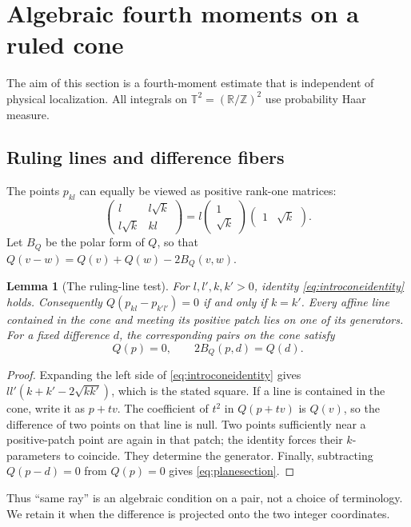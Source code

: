 \documentclass[11pt,reqno]{amsart}
\numberwithin{equation}{section}
\newtheorem{lemma}[lemma]{Lemma}
\theoremstyle{definition}
\theoremstyle{remark}
\newcommand{\R}{\mathbb R}
\newcommand{\T}{\mathbb T}
\newcommand{\Z}{\mathbb Z}
\begin{document}
\FloatBarrier

\section{Algebraic fourth moments on a ruled cone}\label{sec:algebra}\label{sec:energy}
The aim of this section is a fourth-moment estimate that is independent of physical
localization. All integrals on $\T^2=(\R/\Z)^2$ use probability Haar measure.

\subsection{Ruling lines and difference fibers}
The points $p_{kl}$ can equally be viewed as positive rank-one matrices:
\[
 \begin{pmatrix}l&l\sqrt{k}\\l\sqrt{k}&kl\end{pmatrix}
 =l\begin{pmatrix}1\\\sqrt{k}\end{pmatrix}
       \begin{pmatrix}1&\sqrt{k}\end{pmatrix}.
\]
Let $B_Q$ be the polar form of $Q$, so that
$Q(v-w)=Q(v)+Q(w)-2B_Q(v,w)$.

\begin{lemma}[The ruling-line test]\label{lem:ruling}
For $l,l',k,k'>0$, identity \eqref{eq:introconeidentity} holds.
Consequently $Q(p_{kl}-p_{k'l'})=0$ if and only if $k=k'$.
Every affine line contained in the cone and meeting its positive patch lies on one of
its generators. For a fixed difference $d$, the corresponding pairs on the cone satisfy
\begin{equation}\label{eq:planesection}
 Q(p)=0,\qquad 2B_Q(p,d)=Q(d).
\end{equation}
\end{lemma}
\begin{proof}
Expanding the left side of \eqref{eq:introconeidentity} gives
$ll'(k+k'-2\sqrt{kk'})$, which is the stated square.
If a line is contained in the cone, write it as $p+tv$.
The coefficient of $t^2$ in $Q(p+tv)$ is $Q(v)$, so the difference of two points on that
line is null. Two points sufficiently near a positive-patch point are again in that
patch; the identity forces their $k$-parameters to coincide. They determine the generator.
Finally, subtracting $Q(p-d)=0$ from $Q(p)=0$ gives \eqref{eq:planesection}.
\end{proof}
Thus ``same ray'' is an algebraic condition on a pair, not a choice of terminology.
We retain it when the difference is projected onto the two integer coordinates.
\end{document}
